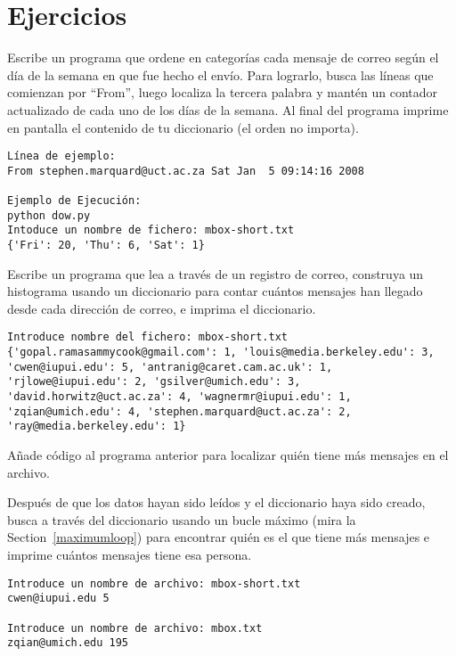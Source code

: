 \section{Ejercicios}

\begin{ex}
Escribe un programa que ordene en categorías cada mensaje de correo según
el día de la semana en que fue hecho el envío. Para lograrlo, busca
las líneas que comienzan por ``From'', luego localiza la
tercera palabra y mantén un contador actualizado de cada uno
de los días de la semana. Al final del programa imprime en pantalla
el contenido de tu diccionario (el orden no importa).

\beforeverb
\begin{verbatim}
Línea de ejemplo:
From stephen.marquard@uct.ac.za Sat Jan  5 09:14:16 2008

Ejemplo de Ejecución:
python dow.py
Intoduce un nombre de fichero: mbox-short.txt
{'Fri': 20, 'Thu': 6, 'Sat': 1}
\end{verbatim}
\afterverb
\end{ex}

\begin{ex}
Escribe un programa que lea a través de un registro de correo,
construya un histograma usando un diccionario para contar cuántos
mensajes han llegado desde cada dirección de correo,
e imprima el diccionario.

\beforeverb
\begin{verbatim}
Introduce nombre del fichero: mbox-short.txt
{'gopal.ramasammycook@gmail.com': 1, 'louis@media.berkeley.edu': 3, 
'cwen@iupui.edu': 5, 'antranig@caret.cam.ac.uk': 1, 
'rjlowe@iupui.edu': 2, 'gsilver@umich.edu': 3, 
'david.horwitz@uct.ac.za': 4, 'wagnermr@iupui.edu': 1, 
'zqian@umich.edu': 4, 'stephen.marquard@uct.ac.za': 2, 
'ray@media.berkeley.edu': 1}
\end{verbatim}
\afterverb
\end{ex}

\begin{ex}
Añade código al programa anterior para localizar quién
tiene más mensajes en el archivo.

Después de que los datos hayan sido leídos y el diccionario haya
sido creado, busca a través del diccionario usando un bucle máximo
(mira la Section~\ref{maximumloop})
para encontrar quién es el que tiene más
mensajes e imprime cuántos mensajes tiene esa persona.

\beforeverb
\begin{verbatim}
Introduce un nombre de archivo: mbox-short.txt
cwen@iupui.edu 5

Introduce un nombre de archivo: mbox.txt
zqian@umich.edu 195
\end{verbatim}
\afterverb
\end{ex}

